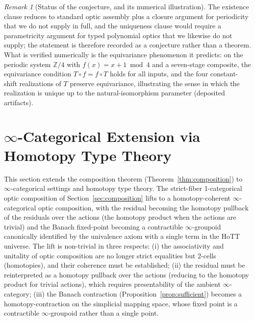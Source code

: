 \documentclass[11pt,a4paper]{article}
\theoremstyle{plain}
\theoremstyle{definition}
\theoremstyle{remark}
\newtheorem{remark}[theorem]{Remark}
\begin{document}
\begin{remark}[Status of the conjecture, and its numerical
illustration]\label{rem:functorial-status}
The existence clause reduces to standard optic assembly plus a
closure argument for periodicity that we do not supply in full,
and the uniqueness clause would require a parametricity argument
for typed polynomial optics that we likewise do not supply; the
statement is therefore recorded as a conjecture rather than a
theorem. What is verified numerically is the equivariance
phenomenon it predicts: on the periodic system
$\mathbb Z/4$ with $f(x)=x+1\bmod4$ and a seven-stage composite,
the equivariance condition $T\circ f=f\circ T$ holds for all
inputs, and the four constant-shift realizations of $T$ preserve
equivariance, illustrating the sense in which the realization is
unique up to the natural-isomorphism parameter (deposited
artifacts).
\end{remark}


\section{$\infty$-Categorical Extension via Homotopy Type Theory}\label{sec:hott}

This section extends the composition theorem
(Theorem~\ref{thm:composition})
to $\infty$-categorical settings and homotopy type theory. The
strict-fiber 1-categorical optic composition of
Section~\ref{sec:composition} lifts to a homotopy-coherent
$\infty$-categorical optic composition, with the residual becoming the homotopy
pullback of the residuals over the actions (the homotopy product
when the actions are trivial) and the Banach fixed-point becoming a
contractible
$\infty$-groupoid canonically identified by the univalence axiom with a
single term in the HoTT universe. The lift is non-trivial in three
respects: (i) the associativity and unitality of optic composition are
no longer strict equalities but 2-cells (homotopies), and their
coherence must be established; (ii) the residual must be reinterpreted
as a homotopy pullback over the actions (reducing to the homotopy
product for trivial actions), which requires presentability of the ambient
$\infty$-category; (iii) the Banach contraction
(Proposition~\ref{prop:sufficient}) becomes a homotopy-contraction on
the simplicial mapping space, whose fixed point is a contractible
$\infty$-groupoid rather than a single point.
\end{document}

